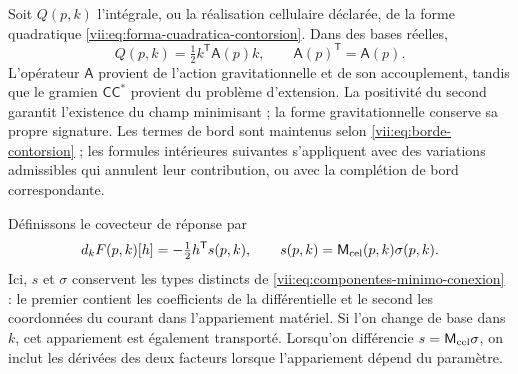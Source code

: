 Soit \(Q(p,k)\) l'intégrale, ou la réalisation cellulaire déclarée, de
la forme quadratique
\eqref{vii:eq:forma-cuadratica-contorsion}. Dans des bases réelles,
\begin{equation}
 Q(p,k)=\tfrac12 k^{\mathsf T}\mathsf A(p)k,
 \qquad \mathsf A(p)^{\mathsf T}=\mathsf A(p).
 \label{vii:eq:cuadratica-celular-contorsion}
\end{equation}
L'opérateur \(\mathsf A\) provient de l'action gravitationnelle et de son accouplement, tandis que le gramien \(\mathsf C\mathsf C^*\) provient du problème d'extension. La positivité du second garantit l'existence du champ minimisant ; la forme gravitationnelle conserve sa propre signature. Les termes de bord sont maintenus selon \eqref{vii:eq:borde-contorsion} ; les formules intérieures suivantes s'appliquent avec des variations admissibles qui annulent leur contribution, ou avec la complétion de bord correspondante.

Définissons le covecteur de réponse par
\begin{equation}
 d_kF(p,k)[h]= -\tfrac12 h^{\mathsf T}s(p,k),
 \qquad s(p,k)=\mathsf M_{\rm cel}(p,k)\sigma(p,k).
 \label{vii:eq:covector-torsional-minimo}
\end{equation}
Ici, \(s\) et \(\sigma\) conservent les types distincts de
\eqref{vii:eq:componentes-minimo-conexion} : le premier contient les
coefficients de la différentielle et le second les coordonnées du
courant dans l'appariement matériel. Si l'on change de base dans
\(k\), cet appariement est également transporté. Lorsqu'on différencie
\(s=\mathsf M_{\rm cel}\sigma\), on inclut les dérivées des
deux facteurs lorsque l'appariement dépend du paramètre.


